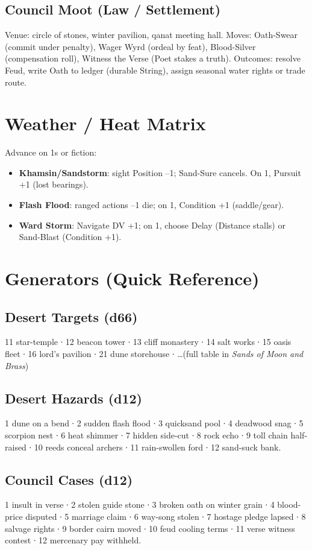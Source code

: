 \documentclass[12pt,oneside]{book}
\begin{document}
\subsection*{Council Moot (Law / Settlement)}
Venue: circle of stones, winter pavilion, qanat meeting hall.  
Moves: Oath-Swear (commit under penalty), Wager Wyrd (ordeal by feat), Blood-Silver (compensation roll), Witness the Verse (Poet stakes a truth).  
Outcomes: resolve Feud, write Oath to ledger (durable String), assign seasonal water rights or trade route.

\section*{Weather / Heat Matrix}
Advance on 1s or fiction:
\begin{itemize}
  \item \textbf{Khamsin/Sandstorm}: sight Position --1; Sand-Sure cancels. On 1, Pursuit +1 (lost bearings).
  \item \textbf{Flash Flood}: ranged actions --1 die; on 1, Condition +1 (saddle/gear).
  \item \textbf{Ward Storm}: Navigate DV +1; on 1, choose Delay (Distance stalls) or Sand-Blast (Condition +1).
\end{itemize}

\section*{Generators (Quick Reference)}
\subsection*{Desert Targets (d66)}
11 star-temple ∙ 12 beacon tower ∙ 13 cliff monastery ∙ 14 salt works ∙ 15 oasis fleet ∙ 16 lord's pavilion ∙ 21 dune storehouse ∙ \dots (full table in \textit{Sands of Moon and Brass})

\subsection*{Desert Hazards (d12)}
1 dune on a bend ∙ 2 sudden flash flood ∙ 3 quicksand pool ∙ 4 deadwood snag ∙ 5 scorpion nest ∙ 6 heat shimmer ∙ 7 hidden side-cut ∙ 8 rock echo ∙ 9 toll chain half-raised ∙ 10 reeds conceal archers ∙ 11 rain-swollen ford ∙ 12 sand-suck bank.

\subsection*{Council Cases (d12)}
1 insult in verse ∙ 2 stolen guide stone ∙ 3 broken oath on winter grain ∙ 4 blood-price disputed ∙ 5 marriage claim ∙ 6 way-song stolen ∙ 7 hostage pledge lapsed ∙ 8 salvage rights ∙ 9 border cairn moved ∙ 10 feud cooling terms ∙ 11 verse witness contest ∙ 12 mercenary pay withheld.
\end{document}
